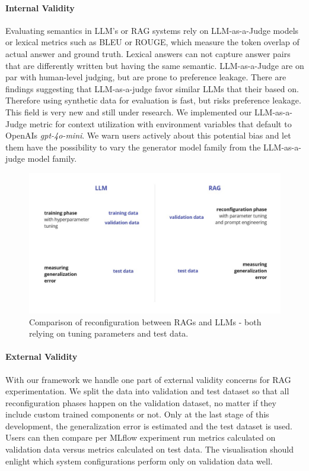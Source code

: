 \paragraph{Internal Validity}
Evaluating semantics in LLM's or RAG systems rely on LLM-as-a-Judge models or lexical metrics such as BLEU or ROUGE, which measure the token overlap of actual answer and ground truth. Lexical answers can not capture answer pairs that are differently written but having the same semantic. LLM-as-a-Judge are on par with human-level judging, but are prone to preference leakage. There are findings suggesting that LLM-as-a-judge favor similar LLMs that their based on. Therefore using synthetic data for evaluation is fast, but risks preference leakage.\cite{Li.03.02.2025} This field is very new and still under research. We implemented our LLM-as-a-Judge metric for context utilization with environment variables that default to OpenAIs \textit{gpt-4o-mini}\cite{OpenAI_2022}. We warn users actively about this potential bias and let them have the possibility to vary the generator model family from the LLM-as-a-judge model family.

\begin{figure}
    \centering
    \includegraphics[width=\textwidth]{images/RAGvsLLM-tuning.pdf}
    \caption{Comparison of reconfiguration between RAGs and LLMs - both relying on tuning parameters and test data.}
    \label{fig:tuning}
\end{figure}

\paragraph{External Validity}

With our framework we handle one part of external validity concerns for RAG experimentation. We split the data into validation and test dataset so that all reconfiguration phases happen on the validation dataset, no matter if they include custom trained components or not. Only at the last stage of this development, the generalization error is estimated and the test dataset is used. Users can then compare per MLflow experiment run metrics calculated on validation data versus metrics calculated on test data. The visualisation should enlight which system configurations perform only on validation data well. 


